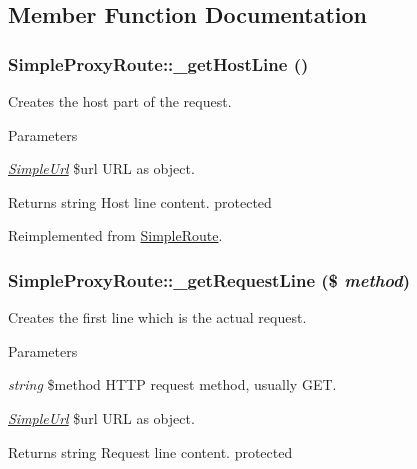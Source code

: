 \subsection{Member Function Documentation}
\hypertarget{class_simple_proxy_route_a5b9617cdd91cbcc393ea84097b5b16ce}{
\subsubsection[{\_\-getHostLine}]{\setlength{\rightskip}{0pt plus 5cm}SimpleProxyRoute::\_\-getHostLine ()}}
\label{class_simple_proxy_route_a5b9617cdd91cbcc393ea84097b5b16ce}
Creates the host part of the request. 
\begin{DoxyParams}{Parameters}
\item[{\em \hyperlink{class_simple_url}{SimpleUrl}}]\$url URL as object. \end{DoxyParams}
\begin{DoxyReturn}{Returns}
string Host line content.  protected 
\end{DoxyReturn}


Reimplemented from \hyperlink{class_simple_route_af9b3205667c83b683a9636eaabc8f485}{SimpleRoute}.\hypertarget{class_simple_proxy_route_a47e158c297e31c2a2988a3a7d586ffb2}{
\subsubsection[{\_\-getRequestLine}]{\setlength{\rightskip}{0pt plus 5cm}SimpleProxyRoute::\_\-getRequestLine (\$ {\em method})}}
\label{class_simple_proxy_route_a47e158c297e31c2a2988a3a7d586ffb2}
Creates the first line which is the actual request. 
\begin{DoxyParams}{Parameters}
\item[{\em string}]\$method HTTP request method, usually GET. \item[{\em \hyperlink{class_simple_url}{SimpleUrl}}]\$url URL as object. \end{DoxyParams}
\begin{DoxyReturn}{Returns}
string Request line content.  protected 
\end{DoxyReturn}


